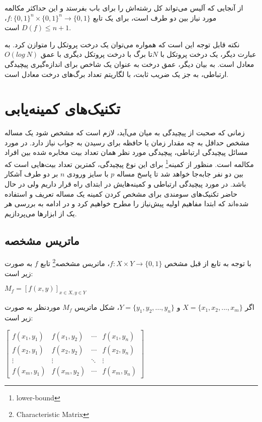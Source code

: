 \par
از آنجایی که آلیس می‌تواند کل رشته‌اش را برای باب بفرستد و این حداکثر مکالمه مورد نیاز بین دو طرف است، برای یک تابع $f: \{0,1\}^n \times \{0,1\}^n \rightarrow \{0, 1\}$، $D(f) \leq n + 1 $ است.

\par

نکته قابل توجه این است که همواره می‌توان یک درخت پروتکل را متوازن کرد. به عبارت دیگر، یک درخت پروتکل با $N$تا برگ با درخت پروتکل دیگری با عمق $O(log\ N)$ معادل است. به بیان دیگر، عمق درخت به عنوان یک شاخص برای اندازه‌گیری پیچیدگی ارتباطی، به جز یک ضریب ثابت، با لگاریتم تعداد برگ‌های درخت معادل است.


\section{تکنیک‌های کمینه‌یابی}
زمانی که صحبت از پیچیدگی به میان می‌آید، لازم است که مشخص شود یک مساله مشخص حداقل به چه مقدار زمان یا حافظه برای رسیدن به جواب نیاز دارد. در مورد مسائل پیچیدگی ارتباطی، پیچیدگی مورد نظر همان تعداد بیت مخابره شده بین افراد مکالمه است. منظور از کمینه\footnote{lower-bound} برای این نوع پیچیدگی، کمترین تعداد بیت‌هایی است که بین دو نفر جابه‌جا خواهد شد تا پاسخ مساله $p$ با سایز ورودی $n$
بر دو طرف آشکار باشد. در مورد پیچیدگی ارتباطی و کمینه‌هایش در ابتدای راه قرار داریم ولی در حال حاضر تکنیک‌های سومندی برای مشخص کردن کمینه یک مساله تعریف و استفاده شده‌اند که ابتدا مفاهیم اولیه پیش‌نیاز را مطرح خواهیم کرد و در ادامه به بررسی هر یک از ابزارها می‌پردازیم.

\subsection{ماتریس مشخصه}
با توجه به تابع از قبل مشخص $f: X \times Y \rightarrow \{0, 1\}$، ماتریس مشخصه\footnote{Characteristic Matrix} تابع $f$ به صورت زیر است:
\begin{center}

    $M_{f} = [f(x,y)]_{x \in X, y \in Y}$

\end{center}
اگر $X=\{x_{1}, x_{2},...,x_{m}\}$ و $Y=\{y_{1}, y_{2},...,y_{n}\}$، شکل ماتریس $M_{f}$ موردنظر به صورت زیر است:
\begin{center}
    $\begin{bmatrix}
         f(x_{1}, y_{1}) & f(x_{1}, y_{2}) & \cdots & f(x_{1}, y_{n}) \\[10pt]
         f(x_{2}, y_{1}) & f(x_{2}, y_{2}) & \cdots & f(x_{2}, y_{n}) \\[10pt]
         \vdots & \vdots & \ddots & \vdots \\[10pt]
         f(x_{m}, y_{1}) & f(x_{m}, y_{2}) & \cdots & f(x_{m}, y_{n})
    \end{bmatrix}$
\end{center}


